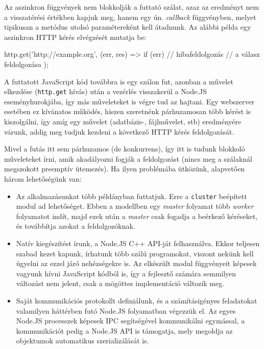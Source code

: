 Az aszinkron függvények nem blokkolják a futtató szálat, azaz az eredményt nem a
visszatérési értékben kapjuk meg, hanem egy ún. \emph{callback} függvényben,
melyet tipikusan a metódus utolsó paramétereként kell átadnunk. Az alábbi példa
egy aszinkron HTTP kérés elvégzését mutatja be:

\begin{js}
http.get('http://example.org', (err, res) => {
  if (err) {
    // hibafeldolgozás
  }
  // a válasz feldolgozása
});
\end{js}

A futtatott JavaScript kód továbbra is egy szálon fut, azonban a művelet
elkezdése (\texttt{http.get} hívás) után a vezérlés visszakerül a Node.JS
eseményhurokjába, így más műveleteket is végre tud az hajtani.  Egy webszerver
esetében ez kívánatos működés, hiszen szeretnénk párhuzamosan több kérést is
kiszolgálni, így amíg egy művelet (adatbázis-, fájlművelet, stb) eredményére
várunk, addig meg tudjuk kezdeni a következő HTTP kérés feldolgozását.

Mivel a futás itt sem párhuzamos (de konkurrens), így itt is tudunk blokkoló
műveleteket írni, amik akadályozni fogják a feldolgozást (nincs meg a szálaknál
megszokott preemptív ütemezés).  Ha ilyen problémába ütközünk, alapvetően három
lehetőségünk van:

\begin{itemize}
\item Az alkalmazásunkat több példányban futtatjuk.  Erre a
  \texttt{cluster}\cite{nodecluster} beépített modul ad lehetőséget.  Ebben a
  modellben egy \emph{master} folyamat több \emph{worker} folyamatot indít, majd
  ezek után a \emph{master} csak fogadja a beérkező kéréseket, és továbbítja
  azokat a feldolgozóknak.
\item Natív kiegészítést\cite{nodecpp} írunk, a Node.JS C++ API-ját
  felhasználva.  Ekkor teljesen szabad kezet kapunk, írhatunk több szálú
  programokat, viszont nekünk kell ügyelni az ezzel járó nehézségekre is.  Az
  elkészült modul függvényeit képesek vagyunk hívni JavaScript kódból is, így a
  fejlesztő számára semmilyen változást nem jelent, csak a mögöttes
  implementáció változik meg.
\item Saját kommunikációs protokollt definiálunk, és a számításigényes
  feladatokat valamilyen háttérben futó Node.JS folyamatban végezzük el.  Az
  egyes Node.JS processzek képesek IPC segítségével kommunikálni egymással, a
  kommunikációt pedig a Node.JS API is támogatja\cite{nodeproc}, mely megoldja
  az objektumok automatikus szerializálását is.
\end{itemize}

